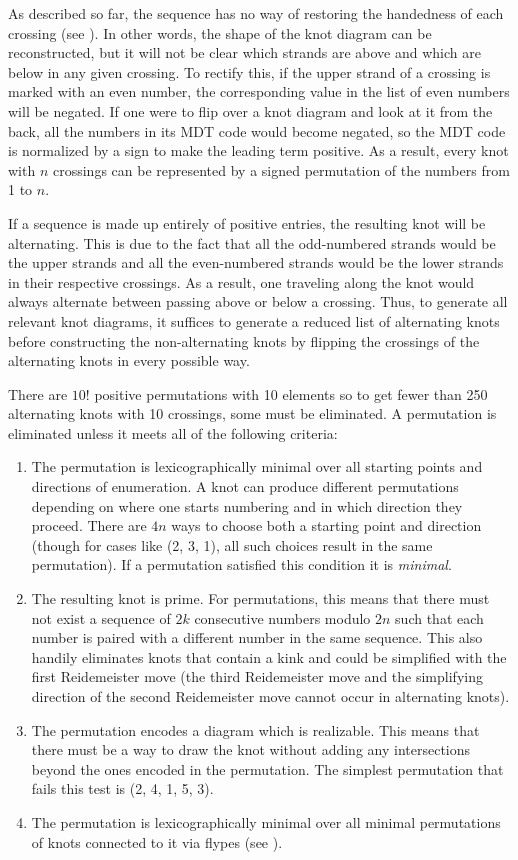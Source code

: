 \begin{paper}
As described so far, the sequence has no way of restoring the handedness of each
crossing (see \figCrossings).
In other words, the shape of the knot diagram can be reconstructed, but it will
not be clear which strands are above and which are below in any given crossing.
To rectify this, if the upper strand of a crossing is marked with an even
number, the corresponding value in the list of even numbers will be negated.
If one were to flip over a knot diagram and look at it from the back, all the
numbers in its MDT code would become negated, so the MDT code is normalized by a
sign to make the leading term positive.
As a result, every knot with $n$ crossings can be represented by a signed
permutation of the numbers from 1 to $n$.


If a sequence is made up entirely of positive entries, the resulting knot will
be alternating.
This is due to the fact that all the odd-numbered strands would be the upper
strands and all the even-numbered strands would be the lower strands in their
respective crossings.
As a result, one traveling along the knot would always alternate between passing
above or below a crossing.
Thus, to generate all relevant knot diagrams, it suffices to generate a reduced
list of alternating knots before constructing the non-alternating knots by
flipping the crossings of the alternating knots in every possible way.

There are $10!$ positive permutations with 10 elements so to get fewer than 250
alternating knots with 10 crossings, some must be eliminated.
A permutation is eliminated unless it meets all of the following criteria:

\begin{enumerate}
\item The permutation is lexicographically minimal over all starting points and
directions of enumeration.
A knot can produce different permutations depending on where one starts
numbering and in which direction they proceed.
There are $4n$ ways to choose both a starting point and direction (though for
cases like (2, 3, 1), all such choices result in the same permutation).
If a permutation satisfied this condition it is \textit{minimal}.
\item The resulting knot is prime.
For permutations, this means that there must not exist a sequence of $2k$
consecutive numbers modulo $2n$ such that each number is paired with a different
number in the same sequence.
This also handily eliminates knots that contain a kink and could be simplified
with the first Reidemeister move (the third Reidemeister move and the
simplifying direction of the second Reidemeister move cannot occur in
alternating knots).
\item The permutation encodes a diagram which is realizable.
This means that there must be a way to draw the knot without adding any
intersections beyond the ones encoded in the permutation.
The simplest permutation that fails this test is (2, 4, 1, 5, 3).
\item The permutation is lexicographically minimal over all minimal
permutations of knots connected to it via flypes (see \figMoves).
\end{enumerate}


\end{paper}
